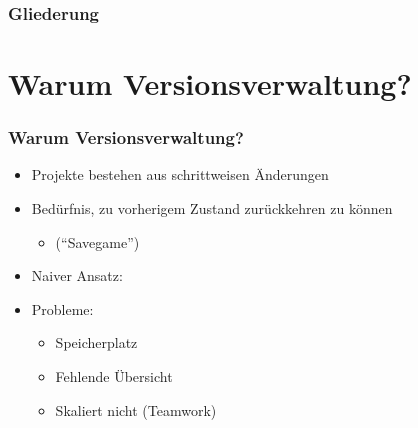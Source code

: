 \documentclass{beamer}
\begin{document}
\begin{frame}[label=wb2]

\begin{center}
 \vspace{10mm}
\end{center}
 
\end{frame}


\begin{frame}[label=ol1]
  \frametitle{Gliederung}
  \tableofcontents
\end{frame}

\section{Warum Versionsverwaltung?}

\begin{frame}[label=why10]
\frametitle{Warum Versionsverwaltung?}

\begin{itemize}
  \item Projekte bestehen aus schrittweisen Änderungen
  \item Bedürfnis, zu vorherigem Zustand zurückkehren zu können
  
  \begin{itemize}
\item  ("`Savegame"')
    \end{itemize}

  \item Naiver Ansatz: \hspace{10mm}
  
  \item Probleme:
  \begin{itemize}
   \item Speicherplatz
   \item Fehlende Übersicht
   \item Skaliert nicht (Teamwork)
  \end{itemize}

  \end{itemize}
\end{frame}
\end{document}
